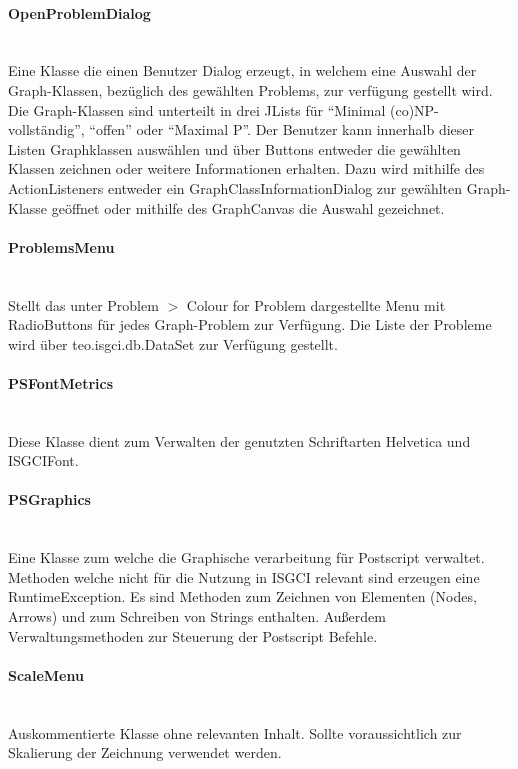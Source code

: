 \documentclass[10pt,a4paper]{article}
\begin{document}
\paragraph{OpenProblemDialog}\ \\Eine Klasse die einen Benutzer Dialog erzeugt, in welchem eine Auswahl der Graph-Klassen, bezüglich des gewählten Problems, zur verfügung gestellt wird. Die Graph-Klassen sind unterteilt in drei JLists für "`Minimal (co)NP-vollständig"', "`offen"' oder "`Maximal P"'.  Der Benutzer kann innerhalb dieser Listen Graphklassen auswählen und über Buttons entweder die gewählten Klassen zeichnen oder weitere Informationen erhalten. Dazu wird mithilfe des ActionListeners entweder ein GraphClassInformationDialog zur gewählten Graph-Klasse geöffnet oder mithilfe des GraphCanvas die Auswahl gezeichnet.

\paragraph{ProblemsMenu}\ \\Stellt das unter Problem $>$ Colour for Problem dargestellte Menu mit RadioButtons für jedes Graph-Problem zur Verfügung. Die Liste der Probleme wird über teo.isgci.db.DataSet zur Verfügung gestellt.

\paragraph{PSFontMetrics}\ \\Diese Klasse dient zum Verwalten der genutzten Schriftarten Helvetica und ISGCIFont.

\paragraph{PSGraphics}\ \\Eine Klasse zum welche die Graphische verarbeitung für Postscript verwaltet. Methoden welche nicht für die Nutzung in ISGCI relevant sind erzeugen eine RuntimeException. Es sind Methoden zum Zeichnen von Elementen (Nodes, Arrows) und zum Schreiben von Strings enthalten. Außerdem Verwaltungsmethoden zur Steuerung der Postscript Befehle. 

\paragraph{ScaleMenu}\ \\Auskommentierte Klasse ohne relevanten Inhalt. Sollte voraussichtlich zur Skalierung der Zeichnung verwendet werden.
\end{document}
